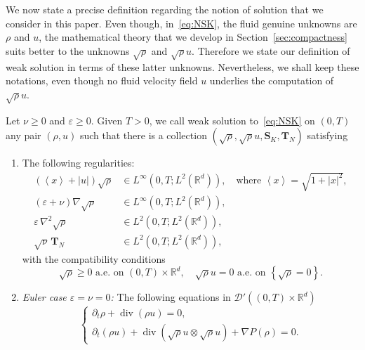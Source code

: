 \documentclass[AHL,Unicode,longabstracts]{cedram}
\DeclareMathOperator{\DIV}{div}
\newcommand*\R{\mathbb{R}}
\newcommand*\<{\left\langle}
\renewcommand*\>{\right\rangle}
\renewcommand*\ge{\geqslant}
\newcommand*\eps{\varepsilon}
\begin{document}
We now state a precise definition regarding the notion of solution that we consider in this paper. Even though, in~\eqref{eq:NSK}, the fluid genuine unknowns are $\rho$ and $u$, the mathematical theory that we develop in Section~\ref{sec:compactness} suits better to the unknowns $\sqrt{\rho}$ and $\sqrt{\rho}u$. Therefore we state our definition of weak solution in terms of these latter unknowns. Nevertheless, we shall keep these notations, even though no fluid velocity field $u$ underlies the computation of $\sqrt{\rho}u.$

\begin{defi}\label{def:weaksol-minus}
Let $\nu \ge 0$ and $\varepsilon \ge 0.$ Given $T >0$, we call weak solution to~\eqref{eq:NSK} on $(0,T)$ any pair $(\rho,u)$ such that there is a collection $(\sqrt{\rho},\sqrt{\rho}u,\mathbf S_{K},\mathbf T_{N})$ satisfying
\begin{enumerate}
\item \label{2.1.1} The following regularities:
\begin{align*}
\left(\<x\> +|u|\right)\sqrt{\rho} &\in L^{\infty}\left(0,T; L^2 (\R^d)\right),\quad \text{where }\<x\> =\sqrt{1+|x|^2}, \\
(\eps+\nu)\nabla \sqrt \rho &\in L^{\infty}\left(0,T; L^2 (\R^d)\right),\\
\varepsilon \, \nabla^2 \sqrt{\rho} &\in L^2(0,T;L^2(\mathbb R^d)),\\
\sqrt \nu \, \mathbf T_N &\in L^2(0,T; L^2(\mathbb R^d)),
\end{align*}
with the compatibility conditions
\[
\sqrt{\rho} \ge 0 \text{ a.e. on } (0,T)\times \R^d, \quad \sqrt{\rho}u= 0 \text{ a.e. on } \left\{\sqrt{\rho} = 0\right\}.
\]

\item \label{2.1.2} \emph{Euler case $\eps=\nu=0$:} The following equations in $\mathcal D'((0,T)\times \mathbb R^d)$
\begin{equation}\label{eq:NSKminus-bis-euler}
\begin{cases}
\partial_t{\rho}+\DIV ({\rho} u)= 0,\\
\partial_t ({\rho}u) +\DIV (\sqrt{\rho}u \otimes \sqrt{\rho}u) + \nabla P(\rho) =0.
\end{cases}
\end{equation}


\end{enumerate}
\end{defi}
\end{document}
